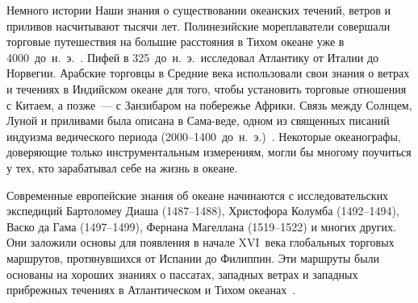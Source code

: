 
\begin{chapter}{Немного истории}\label{chap:2}
Наши знания о существовании океанских течений, ветров и приливов
насчитывают тысячи лет. Полинезийские мореплаватели совершали торговые
путешествия на большие расстояния в Тихом океане уже 
в 4000~до~н.~э.~\cite{Service:1996}. Пифей в 325~до~н.~э.\ исследовал Атлантику
от Италии до Норвегии. Арабские торговцы в Средние века использовали
свои знания о ветрах и течениях в Индийском океане для того, чтобы
установить торговые отношения с Китаем, а позже~--- с Занзибаром на
побережье Африки. Связь между Солнцем, Луной и приливами была
описана в Сама-веде, одном из священных писаний индуизма ведического 
периода (2000--1400~до~н.~э.)~\cite{Pugh:1987}. Некоторые океанографы, 
доверяющие только инструментальным измерениям, могли бы многому
поучиться у тех, кто зарабатывал себе на жизнь в океане.
%

Современные европейские знания об океане начинаются с
исследовательских экспедиций Бартоломеу Диаша (1487--1488), Христофора
Колумба (1492--1494), Васко да Гама (1497--1499), Фернана
Магеллана (1519--1522) и многих других. Они заложили
основы для появления в начале XVI~века глобальных торговых маршрутов,
протянувшихся от Испании до Филиппин. Эти маршруты были основаны на
хороших знаниях о пассатах, западных ветрах и западных прибрежных
течениях в Атлантическом и Тихом океанах~\cite[стр.~192--193]{Couper:1983}.
%


\end{chapter}
